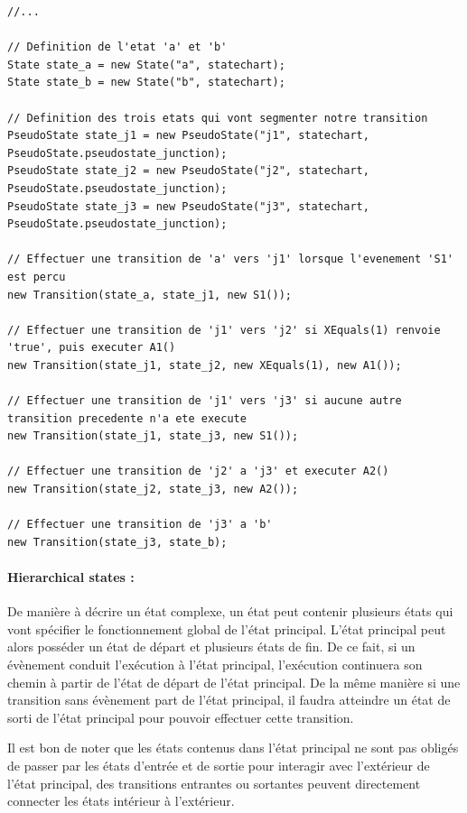 \documentclass[french, 12pt, a4paper]{article}
\begin{document}
        \begin{lstlisting}[basicstyle=\small]
//...

// Definition de l'etat 'a' et 'b'
State state_a = new State("a", statechart);
State state_b = new State("b", statechart);

// Definition des trois etats qui vont segmenter notre transition
PseudoState state_j1 = new PseudoState("j1", statechart, PseudoState.pseudostate_junction);
PseudoState state_j2 = new PseudoState("j2", statechart, PseudoState.pseudostate_junction);
PseudoState state_j3 = new PseudoState("j3", statechart, PseudoState.pseudostate_junction);

// Effectuer une transition de 'a' vers 'j1' lorsque l'evenement 'S1' est percu
new Transition(state_a, state_j1, new S1());

// Effectuer une transition de 'j1' vers 'j2' si XEquals(1) renvoie 'true', puis executer A1()
new Transition(state_j1, state_j2, new XEquals(1), new A1());

// Effectuer une transition de 'j1' vers 'j3' si aucune autre transition precedente n'a ete execute
new Transition(state_j1, state_j3, new S1());

// Effectuer une transition de 'j2' a 'j3' et executer A2()
new Transition(state_j2, state_j3, new A2());

// Effectuer une transition de 'j3' a 'b'
new Transition(state_j3, state_b);
        \end{lstlisting}
        
        
        \paragraph{Hierarchical states : }
        De manière à décrire un état complexe, un état peut contenir plusieurs états qui vont spécifier le fonctionnement global de l'état principal. L'état principal peut alors posséder un état de départ et plusieurs états de fin. De ce fait, si un évènement conduit l'exécution à l'état principal, l'exécution continuera son chemin à partir de l'état de départ de l'état principal. De la même manière si une transition sans évènement part de l'état principal, il faudra atteindre un état de sorti de l'état principal pour pouvoir effectuer cette transition. 
        
        Il est bon de noter que les états contenus dans l'état principal ne sont pas obligés de passer par les états d'entrée et de sortie pour interagir avec l'extérieur de l'état principal, des transitions entrantes ou sortantes peuvent directement connecter les états intérieur à l'extérieur.
        
\end{document}
